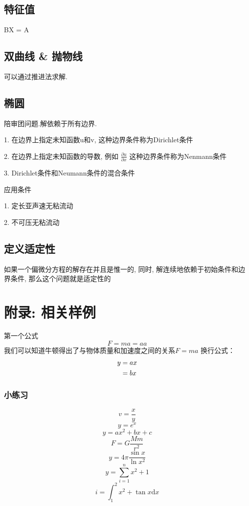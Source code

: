 \documentclass[UTF8]{ctexart}
\begin{document}
\subsection{特征值}
BX = A

\subsection{双曲线 \& 抛物线}

可以通过推进法求解.

\subsection{椭圆}

陪审团问题.解依赖于所有边界.

1. 在边界上指定未知函数u和v, 这种边界条件称为Dirichlet条件

2. 在边界上指定未知函数的导数, 例如 $\frac{\partial u}{\partial x}$ 这种边界条件称为Nenmann条件

3. Dirichlet条件和Neumann条件的混合条件

应用条件

1. 定长亚声速无粘流动

2. 不可压无粘流动

\subsection{定义适定性}

如果一个偏微分方程的解存在并且是惟一的, 同时, 解连续地依赖于初始条件和边界条件, 那么这个问题就是适定性的
\section{附录: 相关样例}
第一个公式
\begin{equation}
	F=ma=aa
\end{equation}
我们可以知道牛顿得出了与物体质量和加速度之间的关系$F=ma$
换行公式：
\begin{align}
	y & =ax\notag \\
	  & =bx
\end{align}

\subsubsection{小练习}
\begin{equation}
	v=\frac{x}{y}
\end{equation}
\begin{equation}
	y=e^{x}
\end{equation}
\begin{equation}
	y=ax^2+bx+c
\end{equation}
\begin{equation}
	F=G\frac{Mm}{r^2}
\end{equation}
\begin{equation}
	y=4\pi \frac{\sin{x}}{\ln{x^2}}
\end{equation}
\begin{equation}
	y=\sum^{n}_{i=1} x^2+1
\end{equation}
\begin{equation}
	i=\int_{1}^{2}x^2+\tan{x}\mathrm{d}x
\end{equation}
\end{document}
